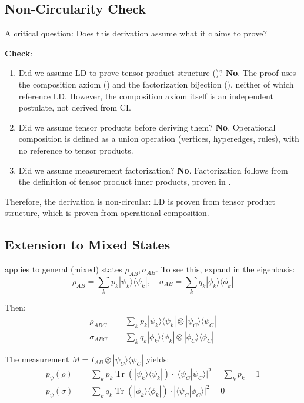 \documentclass[11pt,a4paper]{article}
\theoremstyle{definition}
\theoremstyle{remark}
\DeclareMathOperator{\Tr}{Tr}
\newcommand{\braket}[2]{\langle#1|#2\rangle}
\newcommand{\ketbra}[2]{|#1\rangle\langle#2|}
\newcommand{\abs}[1]{|#1|}
\begin{document}
\subsection{Non-Circularity Check}

A critical question: Does this derivation assume what it claims to prove?

\textbf{Check}:
\begin{enumerate}
\item Did we assume LD to prove tensor product structure ()? \textbf{No}. The proof uses the composition axiom () and the factorization bijection (), neither of which reference LD. However, the composition axiom itself is an independent postulate, not derived from CI.
\item Did we assume tensor products before deriving them? \textbf{No}. Operational composition is defined as a union operation (vertices, hyperedges, rules), with no reference to tensor products.
\item Did we assume measurement factorization? \textbf{No}. Factorization follows from the definition of tensor product inner products, proven in .
\end{enumerate}

Therefore, the derivation is non-circular: LD is proven from tensor product structure, which is proven from operational composition.

\subsection{Extension to Mixed States}

 applies to general (mixed) states $\rho_{AB}, \sigma_{AB}$. To see this, expand in the eigenbasis:
\begin{equation}
\rho_{AB} = \sum_k p_k \ketbra{\psi_k}{\psi_k}, \quad \sigma_{AB} = \sum_k q_k \ketbra{\phi_k}{\phi_k}
\end{equation}

Then:
\begin{align}
\rho_{ABC} &= \sum_k p_k \ketbra{\psi_k}{\psi_k} \otimes \ketbra{\psi_C}{\psi_C} \\
\sigma_{ABC} &= \sum_k q_k \ketbra{\phi_k}{\phi_k} \otimes \ketbra{\phi_C}{\phi_C}
\end{align}

The measurement $M = I_{AB} \otimes \ketbra{\psi_C}{\psi_C}$ yields:
\begin{align}
p_\psi(\rho) &= \sum_k p_k \Tr(\ketbra{\psi_k}{\psi_k}) \cdot \abs{\braket{\psi_C}{\psi_C}}^2 = \sum_k p_k = 1 \\
p_\psi(\sigma) &= \sum_k q_k \Tr(\ketbra{\phi_k}{\phi_k}) \cdot \abs{\braket{\psi_C}{\phi_C}}^2 = 0
\end{align}
\end{document}
